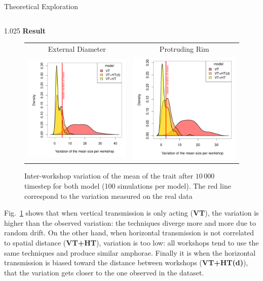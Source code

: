 \documentclass[final]{beamer}
\newlength{\onecolwid}
\newlength{\twocolwid}
\begin{document}
\begin{frame}[t]
\begin{columns}[t]
\begin{column}{\twocolwid}
\begin{block}{Theoretical Exploration}
\begin{columns}[t,totalwidth=\twocolwid]
\begin{column}{1.025\onecolwid} %
{\textbf{Result}}\\
\justify
\vspace{-1cm}
    \begin{figure}[h!]
	\begin{tabular}{cc}
	    \centering
	    \small   External Diameter & \small Protruding Rim\\
	    \includegraphics[width=0.5\linewidth]{images/ED_densities.pdf}&
	    \includegraphics[width=0.5\linewidth]{images/PR_densities.pdf}\\
	\end{tabular}
\singlespace
\vspace{-.8cm}
\caption{Inter-workshop variation of the mean of the trait after $10\,000$ timestep for both model (100 simulations per model). The red line correspond to the variation measured on the real data}
	\label{fig:resmod}
    \end{figure}
Fig.~\ref{fig:resmod} shows that when vertical transmission is only acting ({\footnotesize\textbf{VT}}), the variation is higher than the observed variation: the techniques diverge more and more due to random drift. On the other hand, when horizontal transmission is not correlated to spatial distance ({\footnotesize\textbf{VT+HT}}), variation is too low: all workshops tend to use the same techniques and produce similar amphorae. Finally it is when the horizontal transmission is biased toward the distance between workshops ({\footnotesize\textbf{VT+HT(d)}}), that the variation gets closer to the one observed in the dataset.
\end{column}
\end{columns}


\end{block}
\end{column}
\end{columns}
\end{frame}
\end{document}
